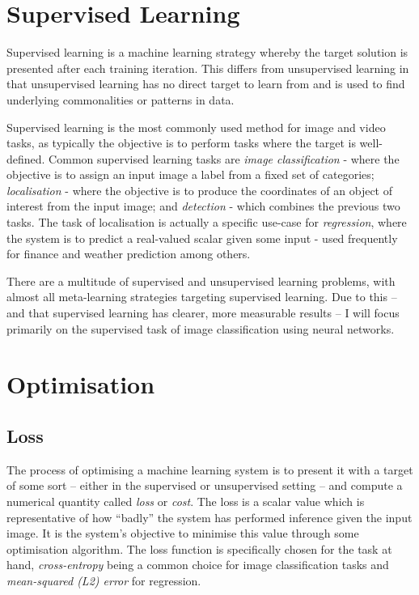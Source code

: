 \documentclass{report}
\begin{document}
	\section{Supervised Learning}
	Supervised learning is a machine learning strategy whereby the target solution is presented after each training iteration. This differs from unsupervised learning in that unsupervised learning has no direct target to learn from and is used to find underlying commonalities or patterns in data. \par
	Supervised learning is the most commonly used method for image and video tasks, as typically the objective is to perform tasks where the target is well-defined. Common supervised learning tasks are \emph{image classification} - where the objective is to assign an input image a label from a fixed set of categories; \emph{localisation} - where the objective is to produce the coordinates of an object of interest from the input image; and \emph{detection} - which combines the previous two tasks. The task of localisation is actually a specific use-case for \emph{regression}, where the system is to predict a real-valued scalar given some input - used frequently for finance and weather prediction among others. \par
	There are a multitude of supervised and unsupervised learning problems, with  almost all meta-learning strategies targeting supervised learning. Due to this -- and that supervised learning has clearer, more measurable results -- I will focus primarily on the supervised task of image classification using neural networks. \par
	

	\section{Optimisation}
	\subsection{Loss} \label{loss:1}
	The process of optimising a machine learning system is to present it with a target of some sort -- either in the supervised or unsupervised setting -- and compute a numerical quantity called \textit{loss} or \textit{cost}. The loss is a scalar value which is representative of how ``badly'' the system has performed inference given the input image. It is the system's objective to minimise this value through some optimisation algorithm. The loss function is specifically chosen for the task at hand, \textit{cross-entropy} being a common choice for image classification tasks and \textit{mean-squared (L2) error}  for regression. \\
	
\end{document}
